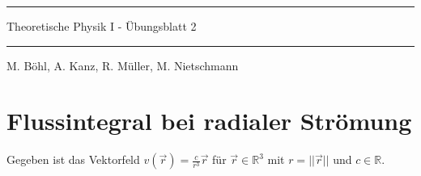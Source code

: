 \documentclass[11pt]{article}
\theoremstyle{plain}
\theoremstyle{definition}
\theoremstyle{remark}
\newcommand{\R}{\mathbb{R}}
\begin{document}
\pagestyle{fancy}
\thispagestyle{plain}

\rule{\textwidth}{.5pt}
\begin{center}
\Huge{Theoretische Physik I - Übungsblatt 2}
\end{center}

\rule{\textwidth}{.5pt}
\text{} \hfill M. Böhl, A. Kanz, R. Müller, M. Nietschmann




\section{Flussintegral bei radialer Strömung}
Gegeben ist das Vektorfeld $v(\vec r) = \frac{c}{r^3} \vec r$ für $\vec r \in \R^3$ mit $r = ||\vec r ||$ und $c \in \R$.
\end{document}
